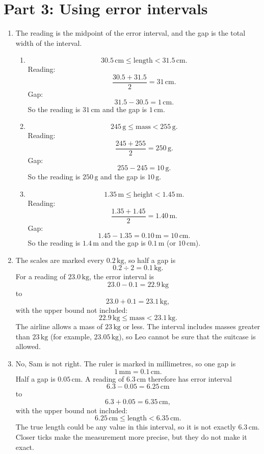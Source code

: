 \documentclass[11pt,a4paper]{article}
\begin{document}
\section*{Part 3: Using error intervals}

\begin{enumerate}[label=\textbf{Q\arabic*.}, start=13, leftmargin=*, itemsep=8pt]

\item 
\begin{solbox}
The reading is the midpoint of the error interval, and the gap is the total width of the interval.
\begin{enumerate}[label=(\alph*), leftmargin=*, itemsep=4pt]
\item
\[
30.5\,\text{cm}\le \text{length}<31.5\,\text{cm}.
\]
Reading:
\[
\frac{30.5+31.5}{2}=31\,\text{cm}.
\]
Gap:
\[
31.5-30.5=1\,\text{cm}.
\]
So the reading is \(\boxed{31\,\text{cm}}\) and the gap is \(\boxed{1\,\text{cm}}\).

\item
\[
245\,\text{g}\le \text{mass}<255\,\text{g}.
\]
Reading:
\[
\frac{245+255}{2}=250\,\text{g}.
\]
Gap:
\[
255-245=10\,\text{g}.
\]
So the reading is \(\boxed{250\,\text{g}}\) and the gap is \(\boxed{10\,\text{g}}\).

\item
\[
1.35\,\text{m}\le \text{height}<1.45\,\text{m}.
\]
Reading:
\[
\frac{1.35+1.45}{2}=1.40\,\text{m}.
\]
Gap:
\[
1.45-1.35=0.10\,\text{m}=10\,\text{cm}.
\]
So the reading is \(\boxed{1.4\,\text{m}}\) and the gap is \(\boxed{0.1\,\text{m}}\) (or \(10\,\text{cm}\)).
\end{enumerate}
\end{solbox}

\item 
\begin{solbox}
The scales are marked every \(0.2\,\text{kg}\), so half a gap is
\[
0.2\div 2=0.1\,\text{kg}.
\]
For a reading of \(23.0\,\text{kg}\), the error interval is
\[
23.0-0.1=22.9\,\text{kg}
\]
to
\[
23.0+0.1=23.1\,\text{kg},
\]
with the upper bound not included:
\[
22.9\,\text{kg}\le \text{mass}<23.1\,\text{kg}.
\]
The airline allows a mass of \(23\,\text{kg}\) or less. The interval includes masses greater than \(23\,\text{kg}\) (for example, \(23.05\,\text{kg}\)), so Leo cannot be sure that the suitcase is allowed.
\end{solbox}

\item 
\begin{solbox}
No, Sam is not right. The ruler is marked in millimetres, so one gap is
\[
1\,\text{mm}=0.1\,\text{cm}.
\]
Half a gap is \(0.05\,\text{cm}\). A reading of \(6.3\,\text{cm}\) therefore has error interval
\[
6.3-0.05=6.25\,\text{cm}
\]
to
\[
6.3+0.05=6.35\,\text{cm},
\]
with the upper bound not included:
\[
6.25\,\text{cm}\le \text{length}<6.35\,\text{cm}.
\]
The true length could be any value in this interval, so it is not exactly \(6.3\,\text{cm}\). Closer ticks make the measurement more precise, but they do not make it exact.
\end{solbox}


\end{enumerate}
\end{document}
